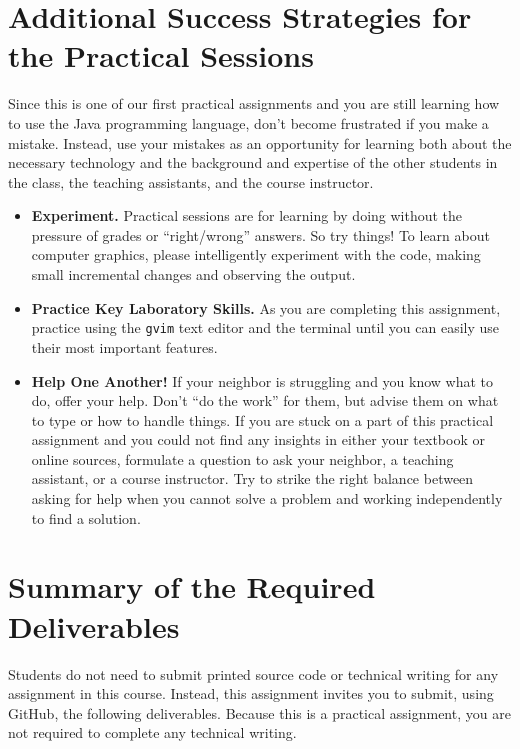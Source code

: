 \documentclass[11pt]{article}
\begin{document}
\section*{Additional Success Strategies for the Practical Sessions}

Since this is one of our first practical assignments and you are still learning how to use the Java programming
language, don't become frustrated if you make a mistake. Instead, use your mistakes as an opportunity for learning both
about the necessary technology and the background and expertise of the other students in the class, the teaching
assistants, and the course instructor.

\vspace*{-.05in}
\begin{itemize}

\itemsep 0in

\item {\bf Experiment.} Practical sessions are for learning by doing without the pressure of grades or ``right/wrong''
  answers. So try things! To learn about computer graphics, please intelligently experiment with the code, making small
  incremental changes and observing the output.

\item {\bf Practice Key Laboratory Skills.} As you are completing this assignment, practice using the {\tt gvim} text
  editor and the terminal until you can easily use their most important features.

\item {\bf Help One Another!} If your neighbor is struggling and you know what to do, offer your help. Don't ``do the
  work'' for them, but advise them on what to type or how to handle things. If you are stuck on a part of this practical
  assignment and you could not find any insights in either your textbook or online sources, formulate a question to ask
  your neighbor, a teaching assistant, or a course instructor. Try to strike the right balance between asking for help
  when you cannot solve a problem and working independently to find a solution.

\end{itemize}

\section*{Summary of the Required Deliverables}

\noindent Students do not need to submit printed source code or technical
writing for any assignment in this course. Instead, this assignment invites you
to submit, using GitHub, the following deliverables. Because this is a practical
assignment, you are not required to complete any technical writing.
\end{document}
